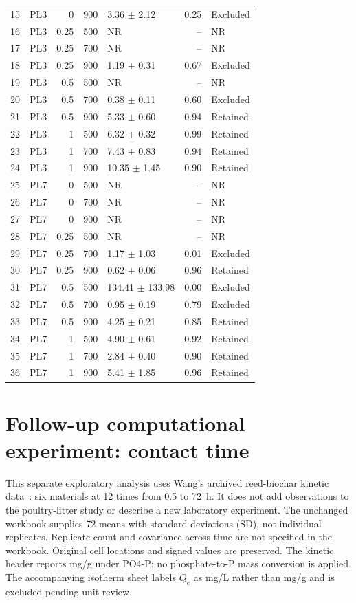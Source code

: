 \documentclass[11pt,letterpaper]{article}
\begin{document}
\begin{longtable}{@{}rrr r l r l@{}}
15 & PL3 & 0 & 900 & 3.36 $\pm$ 2.12 & 0.25 & Excluded \\
16 & PL3 & 0.25 & 500 & NR & -- & NR \\
17 & PL3 & 0.25 & 700 & NR & -- & NR \\
18 & PL3 & 0.25 & 900 & 1.19 $\pm$ 0.31 & 0.67 & Excluded \\
19 & PL3 & 0.5 & 500 & NR & -- & NR \\
20 & PL3 & 0.5 & 700 & 0.38 $\pm$ 0.11 & 0.60 & Excluded \\
21 & PL3 & 0.5 & 900 & 5.33 $\pm$ 0.60 & 0.94 & Retained \\
22 & PL3 & 1 & 500 & 6.32 $\pm$ 0.32 & 0.99 & Retained \\
23 & PL3 & 1 & 700 & 7.43 $\pm$ 0.83 & 0.94 & Retained \\
24 & PL3 & 1 & 900 & 10.35 $\pm$ 1.45 & 0.90 & Retained \\
25 & PL7 & 0 & 500 & NR & -- & NR \\
26 & PL7 & 0 & 700 & NR & -- & NR \\
27 & PL7 & 0 & 900 & NR & -- & NR \\
28 & PL7 & 0.25 & 500 & NR & -- & NR \\
29 & PL7 & 0.25 & 700 & 1.17 $\pm$ 1.03 & 0.01 & Excluded \\
30 & PL7 & 0.25 & 900 & 0.62 $\pm$ 0.06 & 0.96 & Retained \\
31 & PL7 & 0.5 & 500 & 134.41 $\pm$ 133.98 & 0.00 & Excluded \\
32 & PL7 & 0.5 & 700 & 0.95 $\pm$ 0.19 & 0.79 & Excluded \\
33 & PL7 & 0.5 & 900 & 4.25 $\pm$ 0.21 & 0.85 & Retained \\
34 & PL7 & 1 & 500 & 4.90 $\pm$ 0.61 & 0.92 & Retained \\
35 & PL7 & 1 & 700 & 2.84 $\pm$ 0.40 & 0.90 & Retained \\
36 & PL7 & 1 & 900 & 5.41 $\pm$ 1.85 & 0.96 & Retained \\
\end{longtable}
\clearpage
\normalsize
\section{Follow-up computational experiment: contact time}\label{app:kinetics}
This separate exploratory analysis uses Wang's archived reed-biochar kinetic data~\cite{wangdata}: six materials at 12 times from 0.5 to 72~h. It does not add observations to the poultry-litter study or describe a new laboratory experiment. The unchanged workbook supplies 72 means with standard deviations (SD), not individual replicates. Replicate count and covariance across time are not specified in the workbook. Original cell locations and signed values are preserved. The kinetic header reports mg/g under PO4-P; no phosphate-to-P mass conversion is applied. The accompanying isotherm sheet labels $Q_e$ as mg/L rather than mg/g and is excluded pending unit review.
\end{document}
